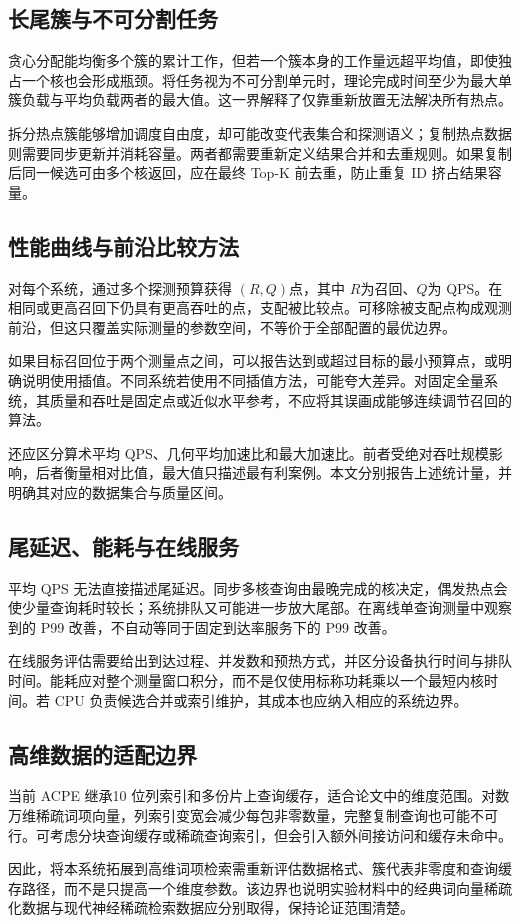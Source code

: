 \subsection{长尾簇与不可分割任务}
贪心分配能均衡多个簇的累计工作，但若一个簇本身的工作量远超平均值，即使独占一个核也会形成瓶颈。将任务视为不可分割单元时，理论完成时间至少为最大单簇负载与平均负载两者的最大值。这一界解释了仅靠重新放置无法解决所有热点。

拆分热点簇能够增加调度自由度，却可能改变代表集合和探测语义；复制热点数据则需要同步更新并消耗容量。两者都需要重新定义结果合并和去重规则。如果复制后同一候选可由多个核返回，应在最终 Top-K 前去重，防止重复 ID 挤占结果容量。

\subsection{性能曲线与前沿比较方法}
对每个系统，通过多个探测预算获得 $(R,Q)$点，其中 $R$为召回、$Q$为 QPS。在相同或更高召回下仍具有更高吞吐的点，支配被比较点。可移除被支配点构成观测前沿，但这只覆盖实际测量的参数空间，不等价于全部配置的最优边界。

如果目标召回位于两个测量点之间，可以报告达到或超过目标的最小预算点，或明确说明使用插值。不同系统若使用不同插值方法，可能夸大差异。对固定全量系统，其质量和吞吐是固定点或近似水平参考，不应将其误画成能够连续调节召回的算法。

还应区分算术平均 QPS、几何平均加速比和最大加速比。前者受绝对吞吐规模影响，后者衡量相对比值，最大值只描述最有利案例。本文分别报告上述统计量，并明确其对应的数据集合与质量区间。

\subsection{尾延迟、能耗与在线服务}
平均 QPS 无法直接描述尾延迟。同步多核查询由最晚完成的核决定，偶发热点会使少量查询耗时较长；系统排队又可能进一步放大尾部。在离线单查询测量中观察到的 P99 改善，不自动等同于固定到达率服务下的 P99 改善。

在线服务评估需要给出到达过程、并发数和预热方式，并区分设备执行时间与排队时间。能耗应对整个测量窗口积分，而不是仅使用标称功耗乘以一个最短内核时间。若 CPU 负责候选合并或索引维护，其成本也应纳入相应的系统边界。

\subsection{高维数据的适配边界}
当前 ACPE 继承10 位列索引和多份片上查询缓存，适合论文中的维度范围。对数万维稀疏词项向量，列索引变宽会减少每包非零数量，完整复制查询也可能不可行。可考虑分块查询缓存或稀疏查询索引，但会引入额外间接访问和缓存未命中。

因此，将本系统拓展到高维词项检索需重新评估数据格式、簇代表非零度和查询缓存路径，而不是只提高一个维度参数。该边界也说明实验材料中的经典词向量稀疏化数据与现代神经稀疏检索数据应分别取得，保持论证范围清楚。
